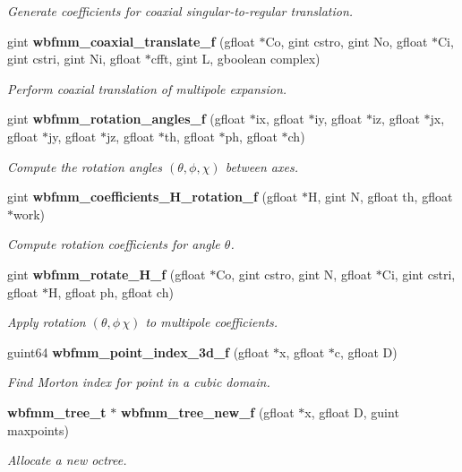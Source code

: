 \begin{DoxyCompactItemize}
\begin{DoxyCompactList}\small\item\em Generate coefficients for coaxial singular-\/to-\/regular translation. \end{DoxyCompactList}\item 
gint {\bf wbfmm\+\_\+coaxial\+\_\+translate\+\_\+f} (gfloat $\ast$Co, gint cstro, gint No, gfloat $\ast$Ci, gint cstri, gint Ni, gfloat $\ast$cfft, gint L, gboolean complex)
\begin{DoxyCompactList}\small\item\em Perform coaxial translation of multipole expansion. \end{DoxyCompactList}\item 
gint {\bf wbfmm\+\_\+rotation\+\_\+angles\+\_\+f} (gfloat $\ast$ix, gfloat $\ast$iy, gfloat $\ast$iz, gfloat $\ast$jx, gfloat $\ast$jy, gfloat $\ast$jz, gfloat $\ast$th, gfloat $\ast$ph, gfloat $\ast$ch)
\begin{DoxyCompactList}\small\item\em Compute the rotation angles $(\theta,\phi,\chi)$ between axes. \end{DoxyCompactList}\item 
gint {\bf wbfmm\+\_\+coefficients\+\_\+\+H\+\_\+rotation\+\_\+f} (gfloat $\ast$H, gint N, gfloat th, gfloat $\ast$work)
\begin{DoxyCompactList}\small\item\em Compute rotation coefficients for angle $\theta$. \end{DoxyCompactList}\item 
gint {\bf wbfmm\+\_\+rotate\+\_\+\+H\+\_\+f} (gfloat $\ast$Co, gint cstro, gint N, gfloat $\ast$Ci, gint cstri, gfloat $\ast$H, gfloat ph, gfloat ch)
\begin{DoxyCompactList}\small\item\em Apply rotation $(\theta,\phi\,\chi)$ to multipole coefficients. \end{DoxyCompactList}\item 
guint64 {\bf wbfmm\+\_\+point\+\_\+index\+\_\+3d\+\_\+f} (gfloat $\ast$x, gfloat $\ast$c, gfloat D)
\begin{DoxyCompactList}\small\item\em Find Morton index for point in a cubic domain. \end{DoxyCompactList}\item 
{\bf wbfmm\+\_\+tree\+\_\+t} $\ast$ {\bf wbfmm\+\_\+tree\+\_\+new\+\_\+f} (gfloat $\ast$x, gfloat D, guint maxpoints)
\begin{DoxyCompactList}\small\item\em Allocate a new octree. \end{DoxyCompactList}\item 

\end{DoxyCompactItemize}

